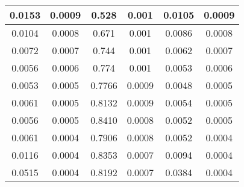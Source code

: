\documentclass[a4paper]{article}
\begin{document}
\begin{table}[ht]
\begin{tabular}{|c|c|c|c|c|c|}
0.0153 & 0.0009 &			0.528& 0.001&   			0.0105& 0.0009\\\hline
0.0104 & 0.0008 &			0.671& 0.001&   			0.0086& 0.0008\\\hline
0.0072 & 0.0007 &			0.744& 0.001&   			0.0062& 0.0007\\\hline
0.0056 & 0.0006 &			0.774& 0.001&   			0.0053& 0.0006\\\hline
0.0053 & 0.0005 &			0.7766& 0.0009&  			0.0048& 0.0005\\\hline
0.0061 & 0.0005 &			0.8132& 0.0009&  			0.0054& 0.0005\\\hline
0.0056 & 0.0005 &			0.8410& 0.0008&  			0.0052& 0.0005\\\hline
0.0061 & 0.0004 &			0.7906& 0.0008&   		0.0052& 0.0004\\\hline
0.0116 & 0.0004 &			0.8353& 0.0007&  			0.0094& 0.0004\\\hline
0.0515 & 0.0004 &			0.8192& 0.0007&       0.0384& 0.0004\\\hline
				\end{tabular}
				\label{tab:trans}
\end{table}
\newpage
\end{document}
